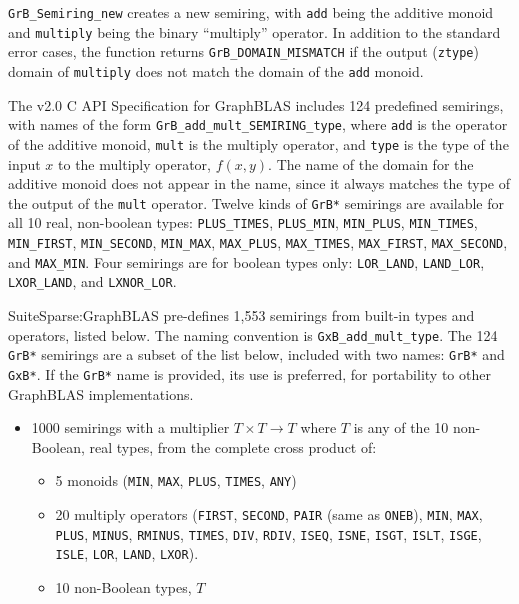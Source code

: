 \documentclass[12pt]{article}
\begin{document}
{\verb'GrB_Semiring_new' creates a new semiring, with \verb'add' being the
additive monoid and \verb'multiply' being the binary ``multiply'' operator.  In
addition to the standard error cases, the function returns
\verb'GrB_DOMAIN_MISMATCH' if the output (\verb'ztype') domain of
\verb'multiply' does not match the domain of the \verb'add' monoid.

The v2.0 C API Specification for GraphBLAS includes 124 predefined semirings,
with names of the form \verb'GrB_add_mult_SEMIRING_type', where \verb'add' is
the operator of the additive monoid, \verb'mult' is the multiply operator, and
\verb'type' is the type of the input $x$ to the multiply operator, $f(x,y)$.
The name of the domain for the additive monoid does not appear in the name,
since it always matches the type of the output of the \verb'mult' operator.
Twelve kinds of \verb'GrB*' semirings are available for all 10 real, non-boolean types:
    \verb'PLUS_TIMES', \verb'PLUS_MIN',
    \verb'MIN_PLUS', \verb'MIN_TIMES', \verb'MIN_FIRST', \verb'MIN_SECOND', \verb'MIN_MAX',
    \verb'MAX_PLUS', \verb'MAX_TIMES', \verb'MAX_FIRST', \verb'MAX_SECOND', and \verb'MAX_MIN'.
Four semirings are for boolean types only: 
    \verb'LOR_LAND', \verb'LAND_LOR', \verb'LXOR_LAND', and \verb'LXNOR_LOR'.

SuiteSparse:GraphBLAS pre-defines 1,553 semirings from built-in types and
operators, listed below.  The naming convention is \verb'GxB_add_mult_type'.
The 124 \verb'GrB*' semirings are a subset of the list below, included with two
names: \verb'GrB*' and \verb'GxB*'.  If the \verb'GrB*' name is provided, its
use is preferred, for portability to other GraphBLAS implementations.

\vspace{-0.05in}
\begin{itemize}
\item 1000 semirings with a multiplier $T \times T \rightarrow T$ where $T$ is
    any of the 10 non-Boolean, real types, from the complete cross product of:

    \vspace{-0.05in}
    \begin{itemize}
    \item 5 monoids (\verb'MIN', \verb'MAX', \verb'PLUS', \verb'TIMES', \verb'ANY')
    \item 20 multiply operators
    (\verb'FIRST', \verb'SECOND', \verb'PAIR' (same as \verb'ONEB'),
    \verb'MIN', \verb'MAX',
    \verb'PLUS', \verb'MINUS', \verb'RMINUS', \verb'TIMES', \verb'DIV', \verb'RDIV',
    \verb'ISEQ', \verb'ISNE', \verb'ISGT',
    \verb'ISLT', \verb'ISGE', \verb'ISLE',
    \verb'LOR', \verb'LAND', \verb'LXOR').
    \item 10 non-Boolean types, $T$
    \end{itemize}


\end{itemize}}
\end{document}
